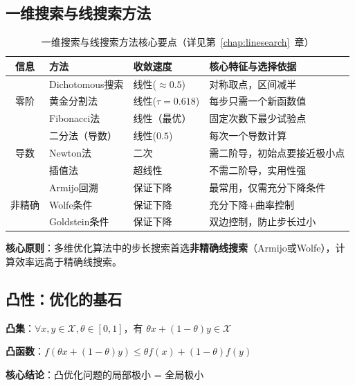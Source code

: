 \subsection{一维搜索与线搜索方法}

\begin{table}[H]
\centering
\small
\caption{一维搜索与线搜索方法核心要点（详见第~\ref{chap:linesearch}~章）}
\label{tab:ch4-summary}
\begin{tabular}{@{}c>{\raggedright\arraybackslash}p{2.5cm}>{\raggedright\arraybackslash}p{2.5cm}>{\raggedright\arraybackslash}p{5.5cm}@{}}
\toprule
\textbf{信息} & \textbf{方法} & \textbf{收敛速度} & \textbf{核心特征与选择依据} \\
\midrule
\multirow{3}{*}{零阶} & Dichotomous搜索 & 线性($\approx 0.5$) & 对称取点，区间减半 \\
 & 黄金分割法 & 线性($\tau=0.618$) & 每步只需一个新函数值 \\
 & Fibonacci法 & 线性（最优） & 固定次数下最少试验点 \\
\midrule
\multirow{3}{*}{导数} & 二分法（导数） & 线性($0.5$) & 每次一个导数计算 \\
 & Newton法 & 二次 & 需二阶导，初始点要接近极小点 \\
 & 插值法 & 超线性 & 不需二阶导，实用性强 \\
\midrule
\multirow{3}{*}{非精确} & Armijo回溯 & 保证下降 & 最常用，仅需充分下降条件 \\
 & Wolfe条件 & 保证下降 & 充分下降$+$曲率控制 \\
 & Goldstein条件 & 保证下降 & 双边控制，防止步长过小 \\
\bottomrule
\end{tabular}
\end{table}

\textbf{核心原则}：多维优化算法中的步长搜索首选\textbf{非精确线搜索}（Armijo或Wolfe），计算效率远高于精确线搜索。

\subsection{凸性：优化的基石}

\begin{kktbox}[凸集与凸函数]
\textbf{凸集}：$\forall x, y \in \mathcal{X}, \theta \in [0,1]$，有 $\theta x + (1-\theta)y \in \mathcal{X}$

\textbf{凸函数}：$f(\theta x + (1-\theta)y) \leq \theta f(x) + (1-\theta)f(y)$

\textbf{核心结论}：凸优化问题的局部极小 = 全局极小
\end{kktbox}

